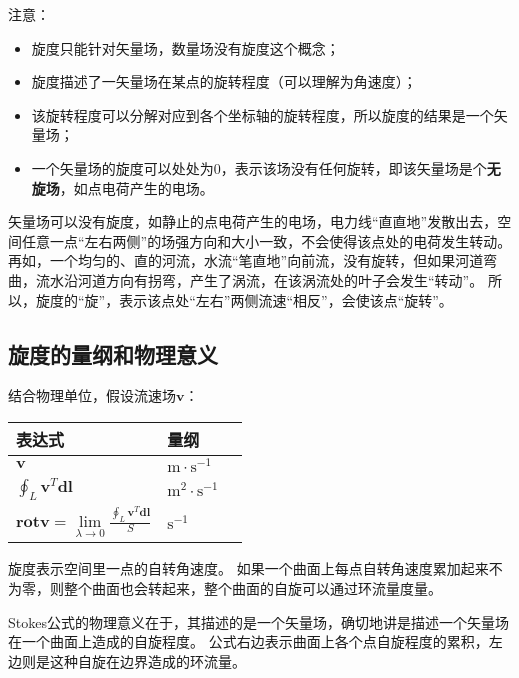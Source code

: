 注意：
\begin{itemize}
    \item 旋度只能针对矢量场，数量场没有旋度这个概念；
    \item 旋度描述了一矢量场在某点的旋转程度（可以理解为角速度）；
    \item 该旋转程度可以分解对应到各个坐标轴的旋转程度，所以旋度的结果是一个矢量场；
    \item 一个矢量场的旋度可以处处为0，表示该场没有任何旋转，即该矢量场是个{\bf 无旋场}，如点电荷产生的电场。
\end{itemize}

\begin{tcolorbox}
矢量场可以没有旋度，如静止的点电荷产生的电场，电力线“直直地”发散出去，空间任意一点“左右两侧”的场强方向和大小一致，不会使得该点处的电荷发生转动。
再如，一个均匀的、直的河流，水流“笔直地”向前流，没有旋转，但如果河道弯曲，流水沿河道方向有拐弯，产生了涡流，在该涡流处的叶子会发生“转动”。
所以，旋度的“旋”，表示该点处“左右”两侧流速“相反”，会使该点“旋转”。
\end{tcolorbox}

\subsection{旋度的量纲和物理意义}

结合物理单位，假设流速场$\boldsymbol{v}$：

\begin{table}[h]
\centering
\begin{tabular}{lll}
    \toprule
    表达式 & 量纲\\
    \midrule
    $\boldsymbol{v}$ & $\mathrm{m}\cdot \mathrm{s}^{-1}$\\
    $\oint_L{\boldsymbol{v}^T\boldsymbol{dl}}$ & $\mathrm{m}^2\cdot \mathrm{s}^{-1}$\\
    $\mathbf{rot}\boldsymbol{v}=\underset{\lambda \rightarrow 0}{\lim}\frac{\oint_L{\boldsymbol{v}^T\boldsymbol{dl}}}{S}$ & $\mathrm{s}^{-1}$\\
    \bottomrule
\end{tabular}
\end{table}

旋度表示空间里一点的自转角速度。
如果一个曲面上每点自转角速度累加起来不为零，则整个曲面也会转起来，整个曲面的自旋可以通过环流量度量。

\begin{tcolorbox}
Stokes公式的物理意义在于，其描述的是一个矢量场，确切地讲是描述一个矢量场在一个曲面上造成的自旋程度。
公式右边表示曲面上各个点自旋程度的累积，左边则是这种自旋在边界造成的环流量。
\end{tcolorbox}


